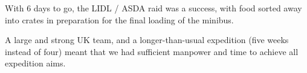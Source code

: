 \begin{marginfigure}
\checkoddpage \ifoddpage \forcerectofloat \else \forceversofloat \fi
\centering
 \caption{With 6 days to go, the LIDL / ASDA raid was a success, with food sorted away into crates in preparation for the final loading of the minibus. }
 \label{crate pack}
\end{marginfigure}

A large and strong UK team, and a longer-than-usual expedition (five
weeks instead of four) meant that we had sufficient manpower and time to
achieve all expedition aims.


